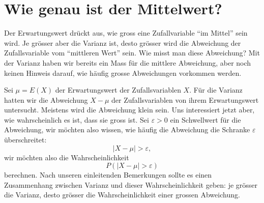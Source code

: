 \section{Wie genau ist der Mittelwert?}
Der Erwartungswert drückt aus, wie gross eine Zufallvariable ``im Mittel''
sein wird.
Je grösser aber die Varianz ist, desto grösser wird die Abweichung
der Zufallsvariable vom ``mittleren Wert'' sein.
Wie misst man diese Abweichung? Mit der Varianz haben wir bereits
ein Mass für die mittlere Abweichung, aber noch keinen Hinweis
darauf, wie häufig grosse Abweichungen vorkommen werden.

Sei $\mu=E(X)$ der Erwartungswert der Zufallsvariablen $X$.
Für die Varianz hatten wir die Abweichung $X-\mu$ der Zufallsvariablen
von ihrem Erwartungswert untersucht.
Meistens wird die Abweichung klein sein.
Uns interessiert jetzt aber,
wie wahrscheinlich es ist, dass sie gross ist.
Sei $\varepsilon>0$ ein Schwellwert für die Abweichung, wir möchten
also wissen, wie häufig die Abweichung die Schranke $\varepsilon$
überschreitet:
\[
|X-\mu|>\varepsilon,
\]
wir möchten also die Wahrscheinlichkeit 
\[
P(|X-\mu|>\varepsilon)
\]
berechnen.
Nach unseren einleitenden Bemerkungen sollte es einen Zusammenhang
zwischen Varianz und dieser Wahrscheinlichkeit geben: je grösser
die Varianz, desto grösser die Wahrscheinlichkeit einer grossen
Abweichung.

